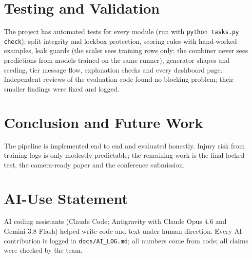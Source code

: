 \documentclass[11pt,a4paper]{report}
\begin{document}
\chapter{Testing and Validation}
The project has automated tests for every module (run with \texttt{python tasks.py check}):
split integrity and lockbox protection, scoring rules with hand-worked examples, leak guards
(the scaler sees training rows only; the combiner never sees predictions from models trained on
the same runner), generator shapes and seeding, tier message flow, explanation checks and every
dashboard page. Independent reviews of the evaluation code found no blocking problem; their
smaller findings were fixed and logged.

\chapter{Conclusion and Future Work}
The pipeline is implemented end to end and evaluated honestly. Injury risk from training logs is
only modestly predictable; the remaining work is the final locked test, the camera-ready paper
and the conference submission.

\appendix
\chapter{AI-Use Statement}
AI coding assistants (Claude Code; Antigravity with Claude Opus 4.6 and Gemini 3.8 Flash) helped
write code and text under human direction. Every AI contribution is logged in
\texttt{docs/AI\_LOG.md}; all numbers come from code; all claims were checked by the team.



\end{document}
